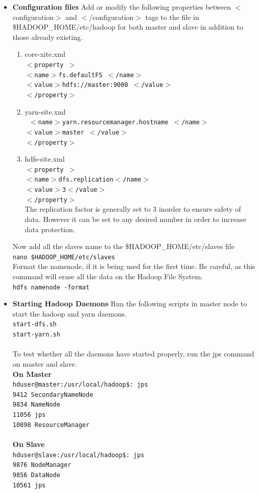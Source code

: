 \documentclass[12pt]{book}
\newcommand{\shellcmd}[1]{\\\indent\texttt{\footnotesize #1}\\}
\begin{document}
\begin{itemize}
\item \textbf{Configuration files}
Add or modify the following properties between $<$configuration$>$ and $<$/configuration$>$ tags to the file in \$HADOOP\_HOME/etc/hadoop
for both master and slave in addition to those already existing.
\begin{enumerate}
\item core-xite.xml
       \shellcmd{$<$property $>$\\ 
                $<$name$>$fs.defaultFS $<$/name$>$ \\ 
                $<$value$>$hdfs://master:9000 $<$/value$>$\\ 
                $<$/property$>$
                }
 \item yarn-site.xml
       \shellcmd{
                $<$name$>$yarn.resourcemanager.hostname $<$/name$>$ \\ 
                $<$value$>$master $<$/value$>$\\ 
                $<$/property$>$
                }
  \item hdfs-site.xml
       \shellcmd{$<$property $>$\\ 
                $<$name$>$dfs.replication$<$/name$>$ \\ 
                $<$value$>$3$<$/value$>$\\ 
                $<$/property$>$
                }
       The replication factor is generally set to 3 inorder to ensure safety of data. However it can be set to any desired number in order
       to increase data protection.
\end{enumerate}
Now add all the slaves name to the \$HADOOP\_HOME/etc/slaves file
\shellcmd{nano \$HADOOP\_HOME/etc/slaves}
Format the namenode, if it is being used for the first time. Be careful, as this command will erase all the data on the Hadoop File System.
\shellcmd{hdfs namenode -format}

\item \textbf{Starting Hadoop Daemons}
Run the following scripts in master node to start the hadoop and yarn daemons.
\shellcmd{start-dfs.sh\\\indent
	  start-yarn.sh\\\indent}
To test whether all the daemons have started properly, run the jps command on master and slave.\\
\textbf{On Master}
\shellcmd{hduser@master:/usr/local/hadoop\$: jps\\
9412   SecondaryNameNode \\
9834   NameNode\\
11056   jps\\
10898  ResourceManager\\
}
\textbf{On Slave}
\shellcmd{hduser@slave:/usr/local/hadoop\$: jps\\
9876   NodeManager \\
9856   DataNode\\
10561  jps\\
}
\end{itemize}
 
\end{document}
